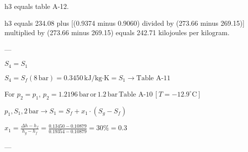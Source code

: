 h3 equals table A-12.  

h3 equals 234.08 plus [(0.9374 minus 0.9060) divided by (273.66 minus 269.15)] multiplied by (273.66 minus 269.15) equals 242.71 kilojoules per kilogram.  

---

\( S_4 = S_1 \)

\( S_4 = S_f(8 \, \text{bar}) = 0.3450 \, \text{kJ/kg·K} = S_1 \rightarrow \text{Table A-11} \)

For \( p_2 = p_1 \), \( p_2 = 1.2196 \, \text{bar} \, \text{or} \, 1.2 \, \text{bar} \, \text{Table A-10} \, [T = -12.9^\circ \text{C}] \)

\( p_1, S_1, 2 \, \text{bar} \rightarrow S_1 = S_f + x_1 \cdot (S_g - S_f) \)

\( x_1 = \frac{\Delta h - h_f}{h_g - h_f} = \frac{0.13450 - 0.10879}{0.19354 - 0.10879} = 30\% = 0.3 \)

---